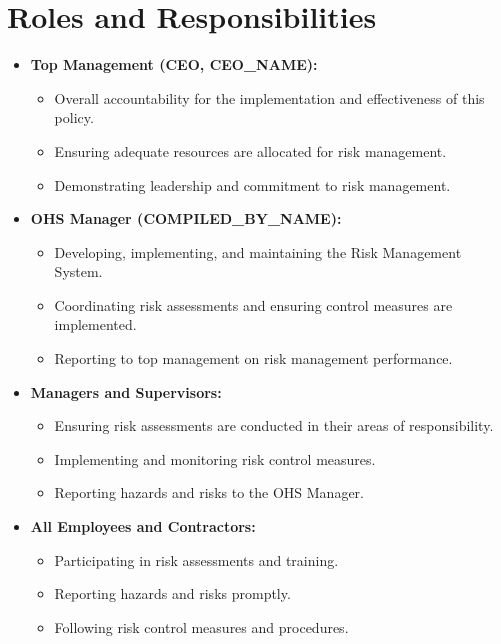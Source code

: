 \documentclass[11pt]{article}
\newcommand{\compilerName}{{{COMPILED_BY_NAME}}}
\begin{document}
\section{Roles and Responsibilities}
\begin{itemize}
    \item \textbf{Top Management (CEO, {{CEO_NAME}}):}
    \begin{itemize}
        \item Overall accountability for the implementation and effectiveness of this policy.
        \item Ensuring adequate resources are allocated for risk management.
        \item Demonstrating leadership and commitment to risk management.
    \end{itemize}
    \item \textbf{OHS Manager (\compilerName):}
    \begin{itemize}
        \item Developing, implementing, and maintaining the Risk Management System.
        \item Coordinating risk assessments and ensuring control measures are implemented.
        \item Reporting to top management on risk management performance.
    \end{itemize}
    \item \textbf{Managers and Supervisors:}
    \begin{itemize}
        \item Ensuring risk assessments are conducted in their areas of responsibility.
        \item Implementing and monitoring risk control measures.
        \item Reporting hazards and risks to the OHS Manager.
    \end{itemize}
    \item \textbf{All Employees and Contractors:}
    \begin{itemize}
        \item Participating in risk assessments and training.
        \item Reporting hazards and risks promptly.
        \item Following risk control measures and procedures.
    \end{itemize}
\end{itemize}
\end{document}
